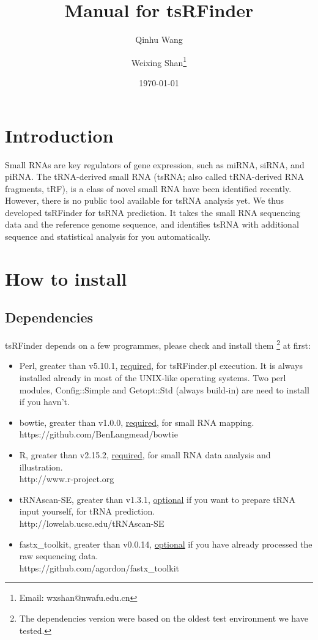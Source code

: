 \documentclass[11pt, a4paper]{article}
\title{Manual for tsRFinder}
\author{Qinhu Wang}
\author{Weixing Shan\thanks{Email: wxshan@nwafu.edu.cn}}
\affil{Northwest A\&F University}
\date{\today}
\begin{document}
\maketitle
\tableofcontents

\section{Introduction}

Small RNAs are key regulators of gene expression, such as miRNA, siRNA, and piRNA. The tRNA-derived small RNA (tsRNA; also called tRNA-derived RNA fragments, tRF), is a class of novel small RNA have been identified recently. However, there is no public tool available for tsRNA analysis yet. We thus developed tsRFinder for tsRNA prediction. It takes the small RNA sequencing data and the reference genome sequence, and identifies tsRNA with additional sequence and statistical analysis for you automatically.

\section{How to install}

\subsection{Dependencies}

tsRFinder depends on a few programmes, please check and install them \footnote{The dependencies version were based on the oldest test environment we have tested.} at first:

\begin{itemize}

\item Perl, greater than v5.10.1, \underline{required}, for tsRFinder.pl execution. It is always installed already in most of the UNIX-like operating systems.
Two perl modules, Config::Simple and Getopt::Std (always build-in) are need to install if you havn't.
\item bowtie, greater than v1.0.0, \underline{required}, for small RNA mapping. \\https://github.com/BenLangmead/bowtie
\item R, greater than v2.15.2, \underline{required}, for small RNA data analysis and illustration. \\http://www.r-project.org
\item tRNAscan-SE, greater than v1.3.1, \underline{optional} if you want to prepare tRNA input yourself, for tRNA prediction. \\http://lowelab.ucsc.edu/tRNAscan-SE
\item fastx\_toolkit, greater than v0.0.14, \underline{optional} if you have already processed the raw sequencing data. \\https://github.com/agordon/fastx\_toolkit

\end{itemize}
\end{document}
